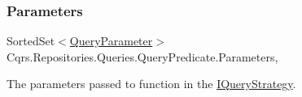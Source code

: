 \subsubsection{\texorpdfstring{Parameters}{Parameters}}
{\footnotesize\ttfamily Sorted\+Set$<$\hyperlink{classCqrs_1_1Repositories_1_1Queries_1_1QueryParameter}{Query\+Parameter}$>$ Cqrs.\+Repositories.\+Queries.\+Query\+Predicate.\+Parameters\hspace{0.3cm}{\ttfamily [get]}, {\ttfamily [set]}}



The parameters passed to function in the \hyperlink{interfaceCqrs_1_1Repositories_1_1Queries_1_1IQueryStrategy}{I\+Query\+Strategy}. 

